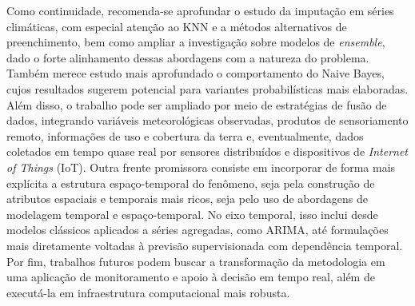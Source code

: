 Como continuidade, recomenda-se aprofundar o estudo da imputação em séries climáticas, com especial atenção ao KNN e a métodos alternativos de preenchimento, bem como ampliar a investigação sobre modelos de \textit{ensemble}, dado o forte alinhamento dessas abordagens com a natureza do problema. Também merece estudo mais aprofundado o comportamento do Naive Bayes, cujos resultados sugerem potencial para variantes probabilísticas mais elaboradas. Além disso, o trabalho pode ser ampliado por meio de estratégias de fusão de dados, integrando variáveis meteorológicas observadas, produtos de sensoriamento remoto, informações de uso e cobertura da terra e, eventualmente, dados coletados em tempo quase real por sensores distribuídos e dispositivos de \textit{Internet of Things} (IoT). Outra frente promissora consiste em incorporar de forma mais explícita a estrutura espaço-temporal do fenômeno, seja pela construção de atributos espaciais e temporais mais ricos, seja pelo uso de abordagens de modelagem temporal e espaço-temporal. No eixo temporal, isso inclui desde modelos clássicos aplicados a séries agregadas, como ARIMA, até formulações mais diretamente voltadas à previsão supervisionada com dependência temporal. Por fim, trabalhos futuros podem buscar a transformação da metodologia em uma aplicação de monitoramento e apoio à decisão em tempo real, além de executá-la em infraestrutura computacional mais robusta.